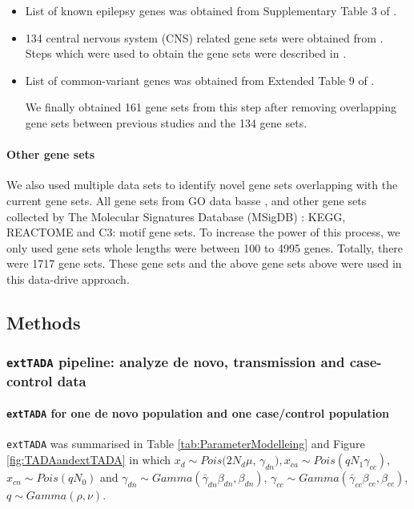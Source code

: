 \documentclass[]{article}
\begin{document}
\begin{itemize}
\item List of known epilepsy genes was obtained from Supplementary
  Table 3 of \cite{phenome2017ultra}.

\item 134 central nervous system (CNS) related gene sets were obtained from
  \cite{pardinas2016common}. Steps which were used to obtain the gene
  sets were described in \cite{pocklington2015novel}.
\item List of common-variant genes was obtained from Extended Table 9
  of \cite{pardinas2016common}.

We finally obtained 161 gene sets from this step after removing
overlapping gene sets between previous studies and the 134 gene sets.

\end{itemize}


\paragraph{Other gene sets}

We also used multiple data sets to identify novel gene sets
overlapping with the current gene sets. All gene sets from GO data
basse \citep{gene2015gene}, and other gene sets collected by The
Molecular Signatures Database (MSigDB) \citep{subramanian2005gene}:
 KEGG, REACTOME and C3: motif gene sets. To increase the power of this
 process, we only used gene sets whole lengths were between 100 to 4995
 genes. Totally, there were 1717 gene sets. These gene sets and the above gene sets above were used in this data-drive approach.

\subsection{Methods}

\normalsize

\subsubsection{\texttt{extTADA} pipeline: analyze de novo, transmission and case-control data}


\paragraph{\texttt{extTADA} for one de novo population and one case/control
  population}

\texttt{extTADA} was summarised in Table \ref{tab:ParameterModelleing}
and Figure \ref{fig:TADAandextTADA} in which $x_d \sim Pois(2N_d\mu$,
$\gamma_{dn}), x_{ca} \sim Pois(qN_1\gamma_{cc})$, $x_{cn} \sim
Pois(qN_0)$ and $\gamma_{dn} \sim Gamma(\bar{\gamma}_{dn}\beta_{dn},
\beta_{dn})$, $\gamma_{cc} \sim Gamma(\bar{\gamma}_{cc}\beta_{cc},
\beta_{cc})$, $q \sim Gamma(\rho, \nu)$.
\end{document}
